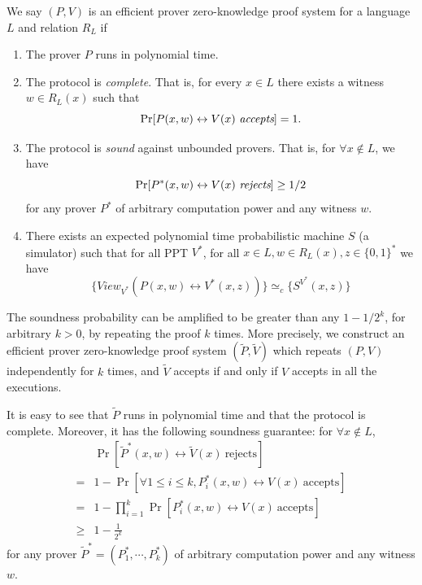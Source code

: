\documentclass[12pt]{tufte-book}
\begin{document}
\begin{definition}
We say $(P, V)$ is an efficient prover zero-knowledge proof system for a language $L$ and relation $R_L$ if \begin{enumerate}

\item The prover $P$ runs in polynomial time.

\item The protocol is \emph{complete}. That is, for every $x \in L$ there exists a witness $w \in R_L (x)$ such that $$\Pr [P(x,w) \leftrightarrow V(x) \ \emph{accepts}] = 1.$$

\item The protocol is \emph{sound} against unbounded provers. That is, for $\forall x \notin L$, we have $$\Pr [P^*(x,w) \leftrightarrow V(x) \ \emph{rejects}] \geq 1/2$$ for any prover $P^*$ of arbitrary computation power and any witness $w$.

\item There exists an expected polynomial time probabilistic machine $S$ (a simulator) such that for all PPT $V^*$, for all $x \in L, w \in R_L (x), z \in \{ 0, 1 \}^*$ we have $$\{ View_{V^*} (P(x,w) \leftrightarrow V^* (x,z)) \} \simeq_c \{ S^{V^*} (x,z) \} $$ \end{enumerate}

\end{definition}

The soundness probability can be amplified to be greater than any $1 - 1/2^k$, for arbitrary $k > 0$, by repeating the proof $k$ times. More precisely, we construct an efficient prover zero-knowledge proof system $(\tilde P, \tilde V)$ which repeats $(P,V)$ independently for $k$ times, and $\tilde V$ accepts if and only if $V$ accepts in all the executions.

It is easy to see that $\tilde P$ runs in polynomial time and that the protocol is complete.
Moreover, it has the following soundness guarantee:
for $\forall x \notin L$,
\begin{align*}
& \Pr \left[\tilde P^*(x,w) \leftrightarrow \tilde V(x) \ \text{rejects}\right]\\
= & 1- \Pr \left[\forall 1\leq i\leq k, P^*_i(x,w) \leftrightarrow V(x) \ \text{accepts}\right] \\
= & 1- \prod_{i=1}^k \Pr \left[P^*_i(x,w) \leftrightarrow V(x) \ \text{accepts}\right] \\
\geq& 1-\frac{1}{2^k}
\end{align*}
for any prover $\tilde P^*=(P^*_1, \cdots, P^*_k)$ of arbitrary computation power and any witness $w$.
\end{document}
